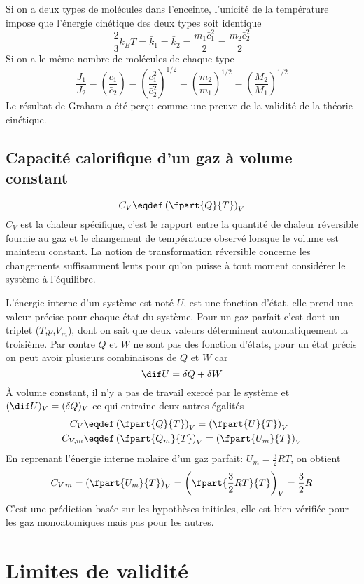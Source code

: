 Si on a deux types de molécules dans l'enceinte,
l'unicité de la température impose que
l'énergie cinétique des deux types soit identique
\[ \frac 23 k_BT = \bar k_1 = \bar k_2 = \frac{m_1\bar c_1^2}{2} =
\frac{m_2\bar c_2^2}{2} \]
Si on a le même nombre de molécules de chaque type
\[ \frac{J_1}{J_2} = \left(\frac{\bar c_1}{\bar c_2}\right) =
\left(\frac{\bar c_1^2}{\bar c_2^2}\right)^{1/2} =
\left(\frac{m_2}{m_1}\right)^{1/2} =
\left(\frac{M_2}{M_1}\right)^{1/2} \]
Le résultat de Graham a été perçu comme
une preuve de la validité de la théorie cinétique.

\subsection{Capacité calorifique d'un gaz à volume constant}
\[ C_V \eqdef \left(\fpart{Q}{T} \right)_V \]
$C_V$ est la chaleur spécifique,
c'est le rapport entre la quantité de chaleur réversible fournie au gaz et
le changement de température observé lorsque le volume est maintenu constant.
La notion de transformation réversible concerne les changements suffisamment
lents pour qu'on puisse à tout moment considérer le système à l'équilibre.

L'énergie interne d'un système est noté $U$, est une fonction d'état,
elle prend une valeur précise pour chaque état du système.
Pour un gaz parfait c'est dont un triplet ($T$,$p$,$V_m$),
dont on sait que deux valeurs déterminent automatiquement la troisième.
Par contre $Q$ et $W$ ne sont pas des fonction d'états,
pour un état précis on peut avoir plusieurs combinaisons de $Q$ et $W$ car
\[ \dif U = \delta Q + \delta W \]
À volume constant, il n'y a pas de travail exercé par le système et
$(\dif U)_V = (\delta Q)_V$ ce qui entraine deux autres égalités
\begin{align*}
  C_V & \eqdef \left(\fpart{Q}{T}\right)_V =
  \left(\fpart{U}{T}\right)_V\\
  C_{V,m} & \eqdef \left(\fpart{Q_m}{T}\right)_V =
  \left(\fpart{U_m}{T}\right)_V
\end{align*}
En reprenant l'énergie interne molaire d'un gaz parfait:
$U_m = \frac 32 RT$, on obtient
\[ C_{V,m} = \left(\fpart{U_m}{T}\right)_V =
\left(\fpart{\frac 32 RT}{T}\right)_V = \frac 32R \]
C'est une prédiction basée sur les hypothèses initiales,
elle est bien vérifiée pour les gaz monoatomiques mais pas pour les autres.

\section{Limites de validité}
